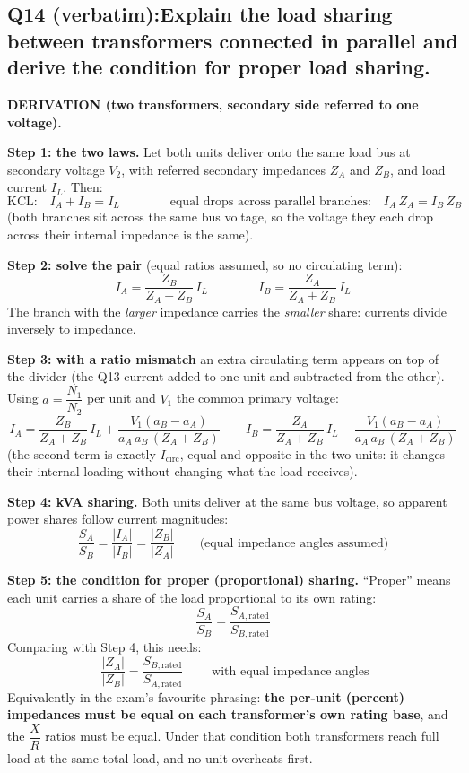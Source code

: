 \documentclass[11pt]{article}
\newcommand{\qhead}[2]{\subsection*{\color{copper}#1\quad\color{iron}#2}}
\newcommand{\tagline}[1]{\textbf{\color{copper}#1}}
\begin{document}
\qhead{Q14 (verbatim):}{Explain the load sharing between transformers connected in parallel and derive the condition for proper load sharing.}

\tagline{DERIVATION (two transformers, secondary side referred to one voltage).}

\textbf{Step 1: the two laws.} Let both units deliver onto the same load bus at secondary voltage $V_2$, with referred secondary impedances $Z_A$ and $Z_B$, and load current $I_L$. Then:
\[
\text{KCL:}\quad I_A + I_B = I_L
\qquad\qquad
\text{equal drops across parallel branches:}\quad I_A\, Z_A = I_B\, Z_B
\]
(both branches sit across the same bus voltage, so the voltage they each drop across their internal impedance is the same).

\textbf{Step 2: solve the pair} (equal ratios assumed, so no circulating term):
\[
\boxed{\;I_A = \frac{Z_B}{Z_A + Z_B}\, I_L
\qquad\qquad
I_B = \frac{Z_A}{Z_A + Z_B}\, I_L\;}
\]
The branch with the \emph{larger} impedance carries the \emph{smaller} share: currents divide inversely to impedance.

\textbf{Step 3: with a ratio mismatch} an extra circulating term appears on top of the divider (the Q13 current added to one unit and subtracted from the other). Using $a = \dfrac{N_1}{N_2}$ per unit and $V_1$ the common primary voltage:
\[
I_A = \frac{Z_B}{Z_A + Z_B}\, I_L + \frac{V_1\left(a_B - a_A\right)}{a_A\, a_B\, \left(Z_A + Z_B\right)}
\qquad
I_B = \frac{Z_A}{Z_A + Z_B}\, I_L - \frac{V_1\left(a_B - a_A\right)}{a_A\, a_B\, \left(Z_A + Z_B\right)}
\]
(the second term is exactly $I_{\text{circ}}$, equal and opposite in the two units: it changes their internal loading without changing what the load receives).

\textbf{Step 4: kVA sharing.} Both units deliver at the same bus voltage, so apparent power shares follow current magnitudes:
\[
\frac{S_A}{S_B} = \frac{\left|I_A\right|}{\left|I_B\right|} = \frac{\left|Z_B\right|}{\left|Z_A\right|}
\qquad\text{(equal impedance angles assumed)}
\]

\textbf{Step 5: the condition for proper (proportional) sharing.} ``Proper'' means each unit carries a share of the load proportional to its own rating:
\[
\frac{S_A}{S_B} = \frac{S_{A,\text{rated}}}{S_{B,\text{rated}}}
\]
Comparing with Step 4, this needs:
\[
\boxed{\;\frac{\left|Z_A\right|}{\left|Z_B\right|} = \frac{S_{B,\text{rated}}}{S_{A,\text{rated}}}\;}
\qquad\text{with equal impedance angles}
\]
Equivalently in the exam's favourite phrasing: \textbf{the per-unit (percent) impedances must be equal on each transformer's own rating base}, and the $\dfrac{X}{R}$ ratios must be equal. Under that condition both transformers reach full load at the same total load, and no unit overheats first.
\end{document}
